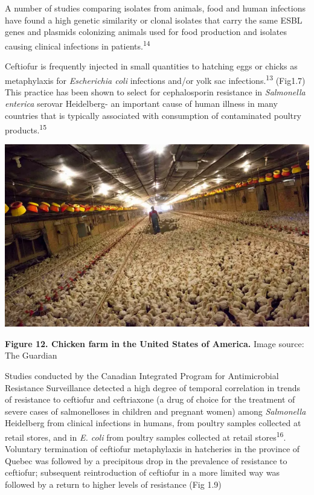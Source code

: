 \documentclass[
]{book}
\begin{document}
A number of studies comparing isolates from animals, food and human infections have found a high genetic similarity or clonal isolates that carry the same ESBL genes and plasmids colonizing animals used for food production and isolates causing clinical infections in patients.\textsuperscript{14}

Ceftiofur is frequently injected in small quantities to hatching eggs or chicks as metaphylaxis for \emph{Escherichia coli} infections and/or yolk sac infections.\textsuperscript{13} (Fig1.7) This practice has been shown to select for cephalosporin resistance in \emph{Salmonella enterica} serovar Heidelberg- an important cause of human illness in many countries that is typically associated with consumption of contaminated poultry products.\textsuperscript{15}

\includegraphics[width=8.33333in,height=\textheight]{images/chicken_farm.png}

\textbf{Figure 12. Chicken farm in the United States of America.} Image source: The Guardian

Studies conducted by the Canadian Integrated Program for Antimicrobial Resistance Surveillance detected a high degree of temporal correlation in trends of resistance to ceftiofur and ceftriaxone (a drug of choice for the treatment of severe cases of salmonelloses in children and pregnant women) among \emph{Salmonella} Heidelberg from clinical infections in humans, from poultry samples collected at retail stores, and in \emph{E. coli} from poultry samples collected at retail stores\textsuperscript{16}. Voluntary termination of ceftiofur metaphylaxis in hatcheries in the province of Quebec was followed by a precipitous drop in the prevalence of resistance to ceftiofur; subsequent reintroduction of ceftiofur in a more limited way was followed by a return to higher levels of resistance (Fig 1.9)
\end{document}
